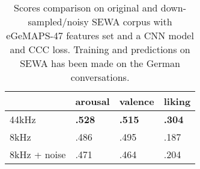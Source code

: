     \begin{table}[htp!]
    \centering
    \begin{tabular}{l| l  l  l  }
        \hline
                    &arousal    &valence   &liking \\
        \hline
        44kHz           &\textbf{.528}  &\textbf{.515} &\textbf{.304} \\
        8kHz            &.486 &.495 &.187 \\
        8kHz + noise    &.471 &.464 &.204 \\
        \hline
    \end{tabular}
    \caption{Scores comparison on original and down-sampled/noisy SEWA corpus with eGeMAPS-47 features set and a CNN model and CCC loss. Training and predictions on SEWA has been made on the German conversations.}
    \label{downsample}
\end{table}

